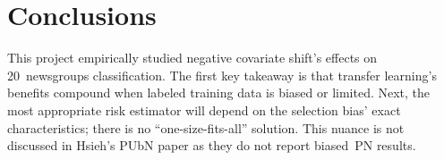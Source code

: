\section{Conclusions}\label{sec:Conclusions}

This project empirically studied negative covariate shift's effects on 20~newsgroups classification.  The first key takeaway is that transfer learning's benefits compound when labeled training data is biased or limited.  Next, the most appropriate risk estimator will depend on the selection bias' exact characteristics; there is no ``one-size-fits-all'' solution.  This nuance is not discussed in Hsieh\etal's PUbN paper as they do not report biased~PN results.
